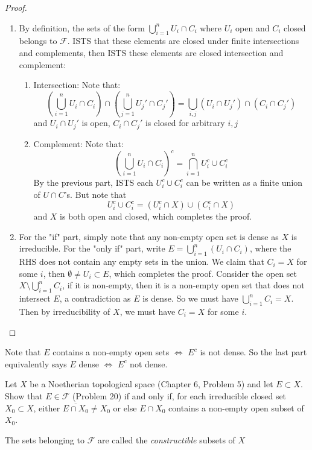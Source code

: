 \documentclass{solution}
\begin{document}
\begin{proof}
    \begin{enumerate}
        \item By definition, the sets of the form $\bigcup\limits_{i = 1}^{n} U_i \cap C_i$ where $U_i$ open and $C_i$ closed belongs to $\mathcal{F}$. ISTS that these elements are closed under finite intersections and complements, then ISTS these elements are closed intersection and complement:
        \begin{enumerate}
            \item Intersection: Note that:
            $$\left(\bigcup\limits_{i = 1}^{n} U_i \cap C_i \right)\cap \left(\bigcup\limits_{j = 1}^{n} U_j' \cap C_j'\right) = \bigcup\limits_{i, j} (U_i \cap U_j') \cap (C_i \cap C_j')$$
            and $U_i \cap U_j'$ is open, $C_i \cap C_j'$ is closed for arbitrary $i, j$
            \item Complement: Note that:
            $$\left(\bigcup\limits_{i = 1}^{n} U_i \cap C_i\right)^c = \bigcap\limits_{i = 1}^{n} U_i^c \cup C_i^c$$
            By the previous part, ISTS each $U_i^c \cup C_i^c$ can be written as a finite union of $U \cap C$'s. But note that
            $$U_i^c \cup C_i^c = (U_i^c \cap X) \cup (C_i^c \cap X)$$
            and $X$ is both open and closed, which completes the proof.
        \end{enumerate}
        \item For the "if" part, simply note that any non-empty open set is dense as $X$ is irreducible. For the "only if" part, write $E = \bigcup\limits_{i = 1}^{n} (U_i \cap C_i)$, where the RHS does not contain any empty sets in the union. We claim that $C_i = X$ for some $i$, then $\emptyset \ne U_i \subset E$, which completes the proof. Consider the open set $X \setminus \bigcup\limits_{i = 1}^{n} C_i$, if it is non-empty, then it is a non-empty open set that does not intersect $E$, a contradiction as $E$ is dense. So we must have $\bigcup\limits_{i = 1}^{n} C_i = X$. Then by irreducibility of $X$, we must have $C_i = X$ for some $i$.
    \end{enumerate}
\end{proof}

{\color{red} Note that $E$ contains a non-empty open sets $\Leftrightarrow$ $E^c$ is not dense. So the last part equivalently says $E$ dense $\Leftrightarrow$ $E^c$ not dense.}

\begin{problem}
    Let $X$ be a Noetherian topological space (Chapter 6, Problem 5) and let $E \subset X$. Show that $E \in \mathcal{F}$ (Problem 20) if and only if, for each irreducible closed set $X_0 \subset X$, either $\overline{E \cap X_0} \ne X_0$ or else $E \cap X_0$ contains a non-empty open subset of $X_0$.

    The sets belonging to $\mathcal{F}$ are called the \textit{constructible} subsets of $X$
\end{problem}
\end{document}
